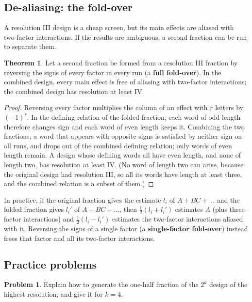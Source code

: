 \documentclass[11pt,a4paper]{article}
\numberwithin{equation}{section}
\theoremstyle{definition}
\newtheorem{thm}{Theorem}[subsection]
\newtheorem{problemx}{Problem}[subsection]
\newenvironment{problem}{\begin{problemx}}{\end{problemx}}
\begin{document}
\subsection{De-aliasing: the fold-over}
A resolution III design is a cheap screen, but its main effects are aliased with two-factor interactions. If the results are ambiguous, a second
fraction can be run to separate them.

\begin{thm}\label{thm:foldover}
Let a second fraction be formed from a resolution III fraction by reversing the signs of every factor in every run (a \textbf{full fold-over}). In the
combined design, every main effect is free of aliasing with two-factor interactions; the combined design has resolution at least IV.
\end{thm}

\begin{proof}
Reversing every factor multiplies the column of an effect with $r$ letters by $(-1)^r$. In the defining relation of the folded fraction, each word of odd
length therefore changes sign and each word of even length keeps it. Combining the two fractions, a word that appears with opposite signs is
satisfied by neither sign on all runs, and drops out of the combined defining relation; only words of even length remain. A design whose
defining words all have even length, and none of length two, has resolution at least IV. (No word of length two can arise, because the original
design had resolution III, so all its words have length at least three, and the combined relation is a subset of them.)
\end{proof}

In practice, if the original fraction gives the estimate $l_i$ of $A + BC + \dots$ and the folded fraction gives $l_i'$ of $A - BC - \dots$, then $\frac12(l_i + l_i')$ estimates $A$ (plus
three-factor interactions) and $\frac12(l_i - l_i')$ estimates the two-factor interactions aliased with it. Reversing the signs of a single factor (a
\textbf{single-factor fold-over}) instead frees that factor and all its two-factor interactions.

\subsection{Practice problems}

\begin{problem}
Explain how to generate the one-half fraction of the $2^k$ design of the highest resolution, and give it for $k = 4$.
\end{problem}
\end{document}
